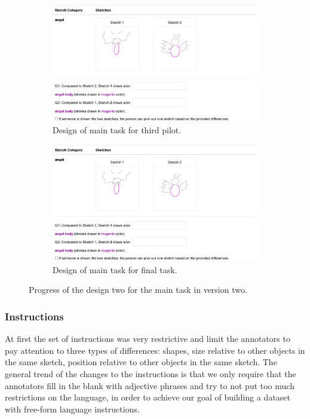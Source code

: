 \begin{figure}[ht!]
\ContinuedFloat
\begin{subfigure}{\textwidth}
  \centering
  \includegraphics[width=.8\linewidth]{data_collection/pilot_02_04_annotation.png}  
  \caption{Design of main task for third pilot.}
  \label{v2.main_task.1.c}
\end{subfigure}
\newline
\begin{subfigure}{\textwidth}
  \centering
  \includegraphics[width=.8\linewidth]{data_collection/pilot_02_04_annotation.png}  
  \caption{Design of main task for final task.}
  \label{v2.main_task.1.d}
\end{subfigure}
\caption{Progress of the design two for the main task in version two.}
\label{v2.main_task.1}
\end{figure}

\subsubsection{Instructions}
At first the set of instructions was very restrictive and limit the annotators to pay attention to three types of differences: shapes, size relative to other objects in the same sketch, position relative to other objects in the same sketch. The general trend of the changes to the instructions is that we only require that the annotators fill in the blank with adjective phrases and try to not put too much restrictions on the language, in order to achieve our goal of building a dataset with free-form language instructions. 

